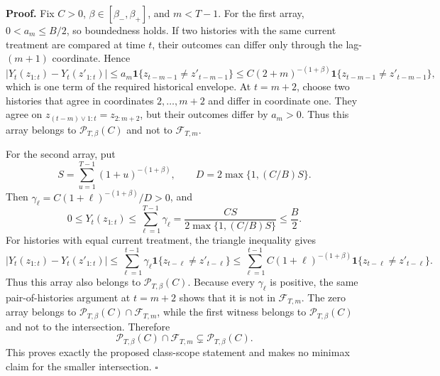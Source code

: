 \textbf{Proof.} Fix \(C>0\), \(\beta\in[\beta_-,\beta_+]\), and \(m<T-1\). For the first array, \(0<a_m\le B/2\), so boundedness holds. If two histories with the same current treatment are compared at time \(t\), their outcomes can differ only through the lag-\((m+1)\) coordinate. Hence
\[
|Y_t(z_{1:t})-Y_t(z'_{1:t})|
\le a_m\mathbf1\{z_{t-m-1}\ne z'_{t-m-1}\}
\le C(2+m)^{-(1+\beta)}
\mathbf1\{z_{t-m-1}\ne z'_{t-m-1}\},
\]
which is one term of the required historical envelope. At \(t=m+2\), choose two histories that agree in coordinates \(2,\ldots,m+2\) and differ in coordinate one. They agree on \(z_{(t-m)\vee1:t}=z_{2:m+2}\), but their outcomes differ by \(a_m>0\). Thus this array belongs to \(\mathcal P_{T,\beta}(C)\) and not to \(\mathcal F_{T,m}\).

For the second array, put
\[
S=\sum_{u=1}^{T-1}(1+u)^{-(1+\beta)},
\qquad
D=2\max\{1,(C/B)S\}.
\]
Then \(\gamma_\ell=C(1+\ell)^{-(1+\beta)}/D>0\), and
\[
0\le Y_t(z_{1:t})
\le\sum_{\ell=1}^{T-1}\gamma_\ell
=\frac{CS}{2\max\{1,(C/B)S\}}
\le\frac B2.
\]
For histories with equal current treatment, the triangle inequality gives
\[
|Y_t(z_{1:t})-Y_t(z'_{1:t})|
\le\sum_{\ell=1}^{t-1}\gamma_\ell
\mathbf1\{z_{t-\ell}\ne z'_{t-\ell}\}
\le\sum_{\ell=1}^{t-1}C(1+\ell)^{-(1+\beta)}
\mathbf1\{z_{t-\ell}\ne z'_{t-\ell}\}.
\]
Thus this array also belongs to \(\mathcal P_{T,\beta}(C)\). Because every \(\gamma_\ell\) is positive, the same pair-of-histories argument at \(t=m+2\) shows that it is not in \(\mathcal F_{T,m}\). The zero array belongs to \(\mathcal P_{T,\beta}(C)\cap\mathcal F_{T,m}\), while the first witness belongs to \(\mathcal P_{T,\beta}(C)\) and not to the intersection. Therefore
\[
\mathcal P_{T,\beta}(C)\cap\mathcal F_{T,m}
\subsetneq\mathcal P_{T,\beta}(C).
\]
This proves exactly the proposed class-scope statement and makes no minimax claim for the smaller intersection. \(\square\)